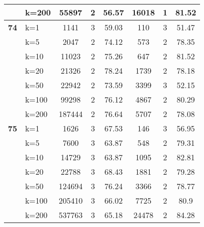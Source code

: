 \begin{table}[htbp]
\begin{tabular}{|l|l|c|c|c|c|c|c|}
     & k=200 & 55897 & 2 & 56.57 & 16018 & 1 & 81.52 \\ \hline
    \multicolumn{1}{|r|}{\textbf{74}} & k=1 & 1141 & 3 & 59.03 & 110 & 3 & 51.47 \\ 
     & k=5 & 2047 & 2 & 74.12 & 573 & 2 & 78.35 \\ 
     & k=10 & 11023 & 2 & 75.26 & 647 & 2 & 81.52 \\ 
     & k=20 & 21326 & 2 & 78.24 & 1739 & 2 & 78.18 \\ 
     & k=50 & 22942 & 2 & 73.59 & 3399 & 3 & 52.15 \\ 
     & k=100 & 99298 & 2 & 76.12 & 4867 & 2 & 80.29 \\ 
     & k=200 & 187444 & 2 & 76.64 & 5707 & 2 & 78.08 \\ \hline
    \multicolumn{1}{|r|}{\textbf{75}} & k=1 & 1626 & 3 & 67.53 & 146 & 3 & 56.95 \\ 
     & k=5 & 7600 & 3 & 63.87 & 548 & 2 & 79.31 \\ 
     & k=10 & 14729 & 3 & 63.87 & 1095 & 2 & 82.81 \\ 
     & k=20 & 22788 & 3 & 68.43 & 1881 & 2 & 79.28 \\ 
     & k=50 & 124694 & 3 & 76.24 & 3366 & 2 & 78.77 \\ 
     & k=100 & 205410 & 3 & 66.02 & 7725 & 2 & 80.9 \\ 
     & k=200 & 537763 & 3 & 65.18 & 24478 & 2 & 84.28 \\ \hline
    \end{tabular}
\end{table}
